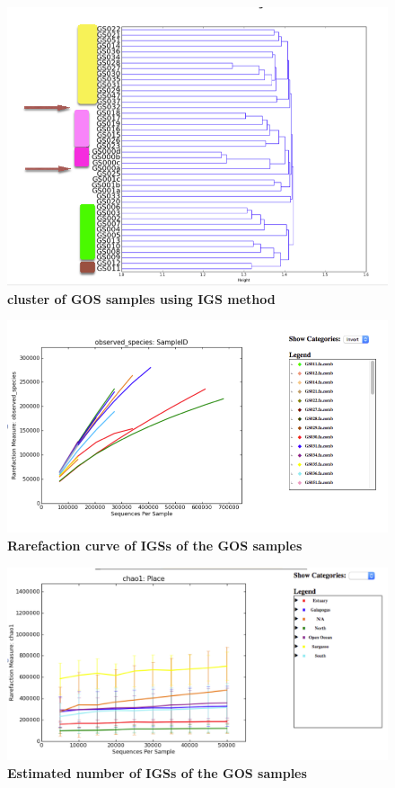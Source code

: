 \documentclass{article}
\begin{document}
\begin{figure}[!ht]
 \centerline{\includegraphics[width=7in]{./figures/GOS_cluster.png}}
\caption{\bf cluster of GOS samples using IGS method}
\label{fig:GOS-beta}
\end{figure}

\begin{figure}[!ht]
 \centerline{\includegraphics[width=7in]{./figures/GOS_observed.png}}
\caption{\bf Rarefaction curve of IGSs of the GOS samples}
\label{fig:GOS-rarefaction}
\end{figure}

\begin{figure}[!ht]
 \centerline{\includegraphics[width=7in]{./figures/GOS_chao.png}}
\caption{\bf Estimated number of IGSs of the GOS samples}
\label{fig:GOS-chao1}
\end{figure}
\end{document}
